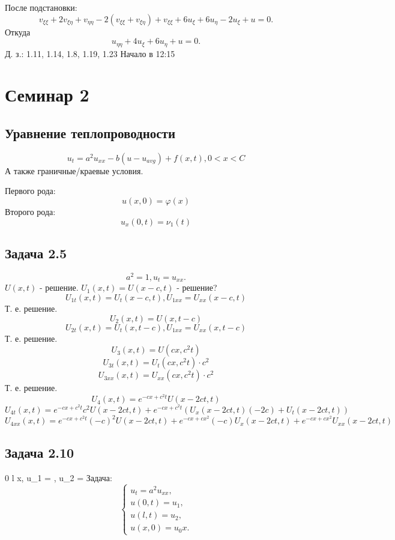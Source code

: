 \documentclass[11pt]{article}
\begin{document}
После подстановки:
\begin{equation}
v_{\xi\xi} + 2v_{\xi\eta} + v_{\eta\eta} - 2(v_{\xi\xi} + v_{\xi\eta}) + v_{\xi\xi} + 6u_{\xi} + 6u_{\eta}
- 2u_{\xi} + u = 0.
\end{equation}
Откуда
\begin{equation}
u_{\eta\eta} + 4u_{\xi} + 6u_{\eta} + u = 0.
\end{equation}
Д. з.: 1.11, 1.14, 1.8, 1.19, 1.23
Начало в 12:15
\section{Семинар 2}
\label{sec:orga0f129c}
\subsection{Уравнение теплопроводности}
\label{sec:org20cbf04}
\begin{equation}
u_t = a^2u_{xx} - b(u - u_{avg}) + f(x, t), 0 < x < C
\end{equation}
А также граничные/краевые условия.

Первого рода:
\begin{equation}
u(x, 0) = \varphi(x)
\end{equation}
Второго рода:
\begin{equation}
u_x(0, t) = \nu_1(t)
\end{equation}
\subsection{Задача 2.5}
\label{sec:org5dfbf7a}
\begin{equation}
a^2 = 1, u_t = u_{xx}.
\end{equation}
$U(x, t)$ - решение.
$U_1(x, t) = U(x - c, t)$ - решение?
$$U_{1t}(x, t) = U_t(x - c, t), U_{1xx} = U_{xx}(x - c, t)$$
Т. е. решение.
$$U_2(x, t) = U(x, t - c)$$
$$U_{2t}(x, t) = U_t(x, t - c), U_{1xx} = U_{xx}(x, t - c)$$
Т. е. решение.
$$U_3(x, t) = U(cx, c^2t)$$
$$U_{3t}(x, t) = U_t(cx, c^2t)\cdot c^2$$
$$U_{3xx}(x, t) = U_{xx}(cx, c^2t)\cdot c^2$$
Т. е. решение.
$$U_4(x, t) = e^{-cx + c^2t}U(x - 2ct, t)$$
$$U_{4t}(x, t) = e^{-cx+c^2t}c^2U(x - 2ct, t) + e^{-cx + c^2t}(U_x(x - 2ct, t)(-2c) + U_t(x - 2ct, t))$$
$$U_{4xx}(x, t) = e^{-cx + c^2t}(-c)^2U(x - 2ct, t) + e^{-cx + cx^2}(-c)U_x(x - 2ct, t) + e^{-cx + cx^2}U_{xx}(x - 2ct, t)$$
\subsection{Задача 2.10}
\label{sec:org82f0346}
0 \leq l \leq x, u_1 = , u_2 = 
Задача:
\begin{equation}
\begin{cases}
u_t = a^2u_{xx}, \\
u(0, t) = u_1, \\
u(l, t) = u_2, \\
u(x, 0) = u_0x.
\end{cases}
\end{equation}
\end{document}
